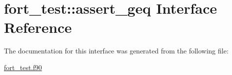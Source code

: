 \hypertarget{interfacefort__test_1_1assert__geq}{}\section{fort\+\_\+test\+:\+:assert\+\_\+geq Interface Reference}
\label{interfacefort__test_1_1assert__geq}


The documentation for this interface was generated from the following file\+:\begin{DoxyCompactItemize}
\item 
\hyperlink{fort__test_8f90}{fort\+\_\+test.\+f90}\end{DoxyCompactItemize}
